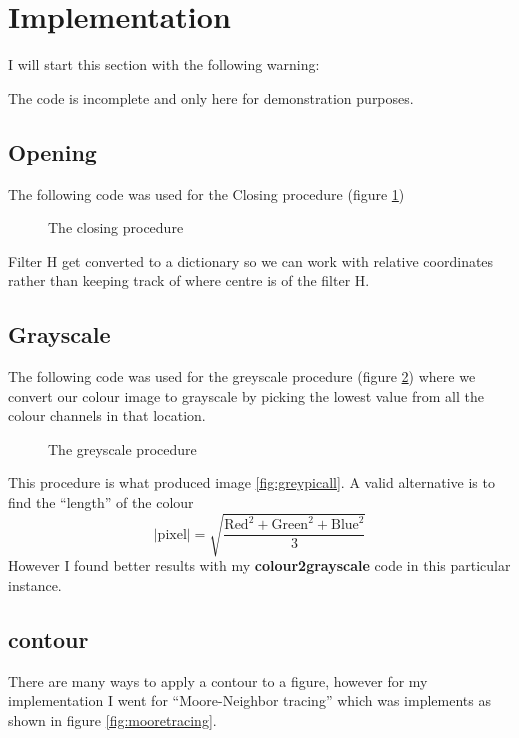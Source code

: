 \documentclass{article}
\begin{document}
\section{Implementation}
I will start this section with the following warning:
\begin{center}
{\huge The code is incomplete and only here for demonstration purposes.}
\end{center}

\subsection{Opening}
The following code was used for the Closing procedure (figure \ref{fig:closing})
\begin{figure}



\caption{The closing procedure}
\label{fig:closing}
\end{figure}

Filter H get converted to a dictionary so we can work with relative coordinates rather than keeping track of where centre is of the filter H.

\subsection{Grayscale}
The following code was used for the greyscale procedure (figure \ref{fig:greyscale}) where we convert our colour image to grayscale by picking the lowest value from all the colour channels in that location.
\begin{figure}


\caption{The greyscale procedure}
\label{fig:greyscale}
\end{figure}

This procedure is what produced image \ref{fig:greypicall}. A valid alternative is to find the “length” of the colour
$$
|\text{pixel}| = \sqrt{\frac{\text{Red}^2+\text{Green}^2+\text{Blue}^2}{3}}
$$
However I found better results with my \textbf{colour2grayscale} code in this particular instance.
\subsection{contour}
There are many ways to apply a contour to a figure, however for my implementation I went for “Moore-Neighbor tracing” which was implements as shown in figure \ref{fig:mooretracing}.
\end{document}
